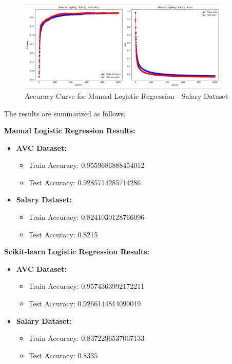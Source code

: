 \documentclass[a4paper,12pt]{article}
\begin{document}
\begin{figure}[H]
    \centering
    \includegraphics[width=0.9\textwidth]{Resources/logreg_curve_salary.jpeg}
    \caption{Accuracy Curve for Manual Logistic Regression - Salary Dataset}
    \label{fig:logreg_curve_salary}
\end{figure}

The results are summarized as follows:

\textbf{Manual Logistic Regression Results:}
\begin{itemize}
    \item \textbf{AVC Dataset:}
        \begin{itemize}
            \item Train Accuracy: 0.9559686888454012
            \item Test Accuracy: 0.9285714285714286
        \end{itemize}
    \item \textbf{Salary Dataset:}
        \begin{itemize}
            \item Train Accuracy: 0.8241030128766096
            \item Test Accuracy: 0.8215
        \end{itemize}
\end{itemize}

\textbf{Scikit-learn Logistic Regression Results:}
\begin{itemize}
    \item \textbf{AVC Dataset:}
        \begin{itemize}
            \item Train Accuracy: 0.9574363992172211
            \item Test Accuracy: 0.9266144814090019
        \end{itemize}
    \item \textbf{Salary Dataset:}
        \begin{itemize}
            \item Train Accuracy: 0.8372296537067133
            \item Test Accuracy: 0.8335
        \end{itemize}
\end{itemize}
\end{document}
